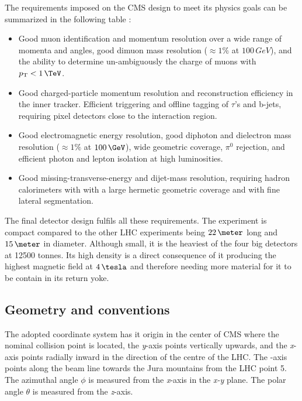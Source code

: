 The requirements imposed on the \gls{CMS} design to meet its physics goals can be summarized in the following table \cite{ARTICLE:CMSTechnicalProposal,ARTICLE:TheCMSExperiment}:

\begin{itemize}
  \item Good muon identification and momentum resolution over a wide range of momenta and angles, good dimuon mass resolution ($\approx 1\%$ at $100\,GeV$), and the ability to determine un-ambiguously the charge of muons with $\pt<1\,\TeV$.
  \item Good charged-particle momentum resolution and reconstruction efficiency in the inner tracker. Efficient triggering and offline tagging of $\tau$'s and b-jets, requiring pixel detectors close to the interaction region.
  \item Good electromagnetic energy resolution, good diphoton and dielectron mass resolution ($\approx 1\%$ at $100\,\GeV$), wide geometric coverage, $\pi^0$ rejection, and efficient photon and lepton isolation at high luminosities.
  \item Good missing-transverse-energy and dijet-mass resolution, requiring hadron calorimeters with with a large hermetic geometric coverage and with fine lateral segmentation.
\end{itemize}

The final detector design fulfils all these requirements. The experiment is compact compared to the other \gls{LHC} experiments being $22\,\meter$ long and $15\,\meter$ in diameter. Although small, it is the heaviest of the four big detectors at 12500 tonnes. Its high density is a direct consequence of it producing the highest magnetic field at $4\,\tesla$ and therefore needing more material for it to be contain in its return yoke. 

\subsection{Geometry and conventions}
\label{SECTION:ExperimentalApparatus_CMS_GeometryConventions}


The adopted coordinate system has it origin in the center of \gls{CMS} where the nominal collision point is located, the \textit{y}-axis points vertically upwards, and the \textit{x}-axis points radially inward in the direction of the centre of the \gls{LHC}. The -axis points along the beam line towards the Jura mountains from the \gls{LHC} point 5. The azimuthal angle $\phi$ is measured from the \textit{x}-axis in the \textit{x-y} plane. The polar angle $\theta$ is measured from the \textit{z}-axis.


